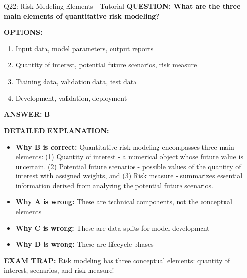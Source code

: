 \documentclass[8pt]{beamer}
\begin{document}
	\begin{frame}{Q22: Risk Modeling Elements - Tutorial}
		\fontsize{6.5}{7.5}\selectfont
		\textbf{QUESTION: What are the three main elements of quantitative risk modeling?}
		
		\vspace{0.1cm}
		\textbf{OPTIONS:}
		\begin{enumerate}
			\item Input data, model parameters, output reports
			\item Quantity of interest, potential future scenarios, risk measure
			\item Training data, validation data, test data
			\item Development, validation, deployment
		\end{enumerate}
		
		\vspace{0.1cm}
		\textcolor{myblue}{\textbf{ANSWER: B}}
		
		\vspace{0.1cm}
		\textbf{DETAILED EXPLANATION:}
		\begin{itemize}
			\item \textbf{Why B is correct:} Quantitative risk modeling encompasses three main elements: (1) Quantity of interest - a numerical object whose future value is uncertain, (2) Potential future scenarios - possible values of the quantity of interest with assigned weights, and (3) Risk measure - summarizes essential information derived from analyzing the potential future scenarios.
			\item \textbf{Why A is wrong:} These are technical components, not the conceptual elements
			\item \textbf{Why C is wrong:} These are data splits for model development
			\item \textbf{Why D is wrong:} These are lifecycle phases
		\end{itemize}
		
		\textcolor{myred}{\textbf{EXAM TRAP:}} Risk modeling has \textcolor{myblue}{three conceptual elements}: quantity of interest, scenarios, and risk measure!
	\end{frame}
	
\end{document}
